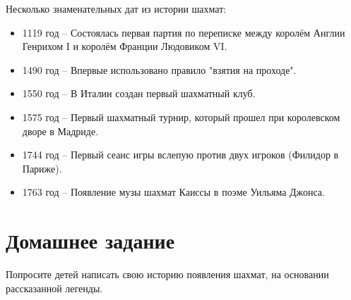 Несколько знаменательных дат из истории шахмат:
\begin{itemize}
\item 1119 год -- Состоялась первая партия по переписке между королём Англии Генрихом I и королём Франции Людовиком VI. 
\item 1490 год -- Впервые использовано правило "взятия на проходе". 
\item 1550 год -- В Италии создан первый шахматный клуб. 
\item 1575 год -- Первый шахматный турнир, который прошел при королевском дворе в Мадриде. 
\item 1744 год -- Первый сеанс игры вслепую против двух игроков (Филидор в Париже).
\item 1763 год -- Появление музы шахмат Каиссы в поэме Уильяма Джонса.
\end{itemize}
 
\section{Домашнее задание}

Попросите детей написать свою историю появления шахмат, на основании рассказанной легенды.
